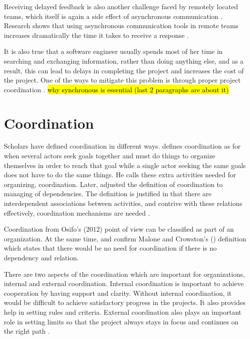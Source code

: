Receiving delayed feedback is also another challenge faced by remotely located teams, which itself is again a side effect of asynchronous communication \citep{conchuir2006exploring,holmstrom2006agile}. Research shows that using asynchronous communication tools in remote teams increases dramatically the time it takes to receive a response \citep{holmstrom2006global}. 

It is also true that a software engineer usually spends most of her time in searching and exchanging information, rather than doing anything else, and as a result, this can lead to delays in completing the project and increases the cost of the project. One of the ways to mitigate this problem is through proper project coordination \citep{dumitriu2006issues}. \hl{why synchronous is essential (last 2 paragraphs are about it)}

\section{Coordination} \label{coordinering}
Scholars have defined coordination in different ways. \citet{Malone1988} defines coordination as for when several actors seek goals together and must do things to organize themselves in order to reach that goal while a single actor seeking the same goals does not have to do the same things. He calls these extra activities needed for organizing, coordination. Later, \citet{Malone1994} adjusted the definition of coordination to managing of dependencies. The definition is justified in that there are interdependent associations between activities, and contrive with these relations effectively, coordination mechanisms are needed \citep{Deng2007}.

Coordination from Osifo's (2012) point of view can be classified as part of an organization. At the same time, \citep{Beuselinck2007} and \citep{Osifo2012} confirm Malone and Crowston’s (\citeyear{Malone1988}) definition which states that there would be no need for coordination if there is no dependency and relation.

There are two aspects of the coordination which are important for organizations, internal and external coordination. Internal coordination is important to achieve cooperation by having support and clarity. Without internal coordination, it would be difficult to achieve satisfactory progress in the projects. It also provides help in setting rules and criteria. External coordination also plays an important role in setting limits so that the project always stays in focus and continues on the right path \citep{Osifo2012}.

